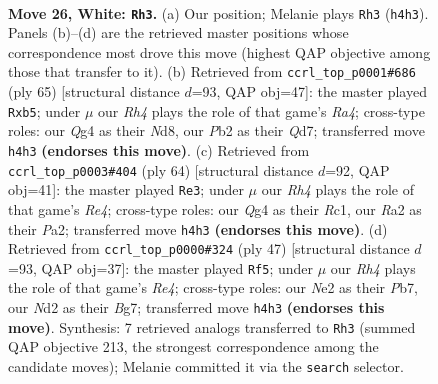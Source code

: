 \documentclass[11pt]{article}
\begin{document}
\clearpage

\begin{figure}[p]\centering
\begin{subfigure}{0.46\textwidth}\centering
\resizebox{\linewidth}{!}{%
\newchessgame
\chessboard[
  setfen={r3k2r/b3n3/4p3/pp2q3/b1p3QR/P7/RP1NNPP1/2B1K3 w kq - 1 26},
  showmover=false,
  pgfstyle=straightmove, color=movearrow, markmove={h4-h3}
]}
\caption{}
\end{subfigure}\hfill
\begin{subfigure}{0.46\textwidth}\centering
\resizebox{\linewidth}{!}{%
\newchessgame
\chessboard[
  setfen={3n2k1/3qbn1p/4p2P/rPp5/5p2/1PB2Q2/3P2B1/2NR2K1 b - - 0 33},
  showmover=false,
  pgfstyle=straightmove, color=movearrow, markmove={a5-b5}
]}
\caption{}
\end{subfigure}
\\[4pt]
\begin{subfigure}{0.46\textwidth}\centering
\resizebox{\linewidth}{!}{%
\newchessgame
\chessboard[
  setfen={5rk1/2p3p1/P1bp4/2p3q1/1r1nRN2/6B1/P2Q2PP/2R3K1 w - - 1 33},
  showmover=false,
  pgfstyle=straightmove, color=movearrow, markmove={e4-e3}
]}
\caption{}
\end{subfigure}\hfill
\begin{subfigure}{0.46\textwidth}\centering
\resizebox{\linewidth}{!}{%
\newchessgame
\chessboard[
  setfen={r5k1/pp3pb1/q5p1/4r1Bn/7P/1NP2Q2/PP3P2/1K1R2R1 b - - 4 24},
  showmover=false,
  pgfstyle=straightmove, color=movearrow, markmove={e5-f5}
]}
\caption{}
\end{subfigure}
\caption{\textbf{Move 26, White: \texttt{Rh3}.} (a) Our position; Melanie plays \texttt{Rh3} (\texttt{h4h3}). Panels (b)--(d) are the retrieved master positions whose correspondence most drove this move (highest QAP objective among those that transfer to it). (b) Retrieved from \texttt{ccrl\_top\_p0001\#686} (ply 65) [structural distance $d$=93, QAP obj=47]: the master played \texttt{Rxb5}; under $\mu$ our \emph{Rh4} plays the role of that game's \emph{Ra4}; cross-type roles: our \emph{Q}g4 as their \emph{N}d8, our \emph{P}b2 as their \emph{Q}d7; transferred move \texttt{h4h3} \textbf{(endorses this move)}. (c) Retrieved from \texttt{ccrl\_top\_p0003\#404} (ply 64) [structural distance $d$=92, QAP obj=41]: the master played \texttt{Re3}; under $\mu$ our \emph{Rh4} plays the role of that game's \emph{Re4}; cross-type roles: our \emph{Q}g4 as their \emph{R}c1, our \emph{R}a2 as their \emph{P}a2; transferred move \texttt{h4h3} \textbf{(endorses this move)}. (d) Retrieved from \texttt{ccrl\_top\_p0000\#324} (ply 47) [structural distance $d$=93, QAP obj=37]: the master played \texttt{Rf5}; under $\mu$ our \emph{Rh4} plays the role of that game's \emph{Re4}; cross-type roles: our \emph{N}e2 as their \emph{P}b7, our \emph{N}d2 as their \emph{B}g7; transferred move \texttt{h4h3} \textbf{(endorses this move)}. Synthesis: 7 retrieved analogs transferred to \texttt{Rh3} (summed QAP objective 213, the strongest correspondence among the candidate moves); Melanie committed it via the \texttt{search} selector.}
\label{fig:thought-m50}
\end{figure}
\end{document}
